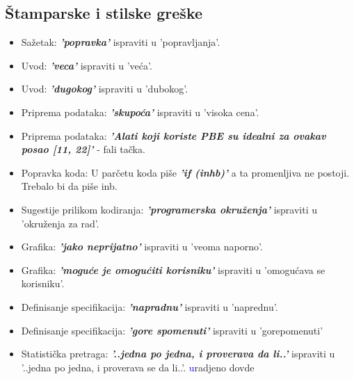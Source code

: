 \documentclass[a4paper]{report}
\newcommand{\odgovor}[1]{\textcolor{blue}{#1}}
\begin{document}
\subsection{Štamparske i stilske greške}
\begin{itemize}
	\item Sažetak: \textbf{\textit{'popravka'}} ispraviti u 'popravljanja'.
	\item Uvod: \textbf{\textit{'veca'}} ispraviti u 'veća'.
    \item Uvod: \textbf{\textit{'dugokog'}} ispraviti u 'dubokog'.
    \item Priprema podataka: \textbf{\textit{'skupoća'}} ispraviti u 'visoka cena'.
    \item Priprema podataka: \textbf{\textit{'Alati koji koriste PBE su idealni za ovakav posao [11, 22]'}} - fali tačka.
    \item Popravka koda: U parčetu koda piše \textbf{\textit{'if (inhb)'}} a ta promenljiva ne postoji. Trebalo bi da piše inb.
    \item Sugestije prilikom kodiranja: \textbf{\textit{'programerska okruženja'}} ispraviti u 'okruženja za rad'.
    \item Grafika: \textbf{\textit{'jako neprijatno'}} ispraviti u 'veoma naporno'.
    \item Grafika: \textbf{\textit{'moguće je omogućiti korisniku'}} ispraviti u 'omogućava se korisniku'.
    \item Definisanje specifikacija: \textbf{\textit{'napradnu'}} ispraviti u 'naprednu'.
    \item Definisanje specifikacija: \textbf{\textit{'gore spomenuti'}} ispraviti u 'gorepomenuti'
    \item Statistička pretraga: \textbf{\textit{'..jedna po jedna, i proverava da li..'}} ispraviti u '..jedna po jedna, i proverava se da li..'.
	\odgovor uradjeno dovde


\end{itemize}
\end{document}
